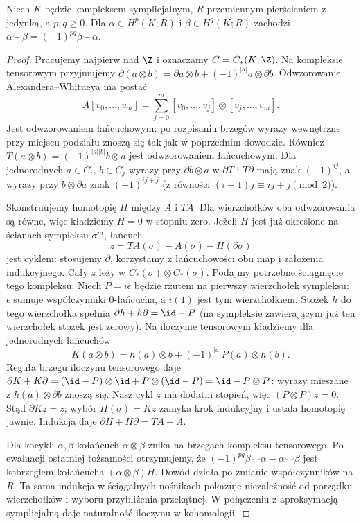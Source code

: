 \begin{stwierdzenie}
\label{prop:kubek-graded-16}
Niech $K$ będzie kompleksem symplicjalnym, $R$ przemiennym
pierścieniem z jedynką, a $p,q\geq0$. Dla
$\alpha\in H^p(K;R)$ i $\beta\in H^q(K;R)$
zachodzi
$\alpha\smile\beta=(-1)^{pq}\beta\smile\alpha$.
\end{stwierdzenie}
\begin{proof}
Pracujemy najpierw nad $\Z$ i oznaczamy $C=C_*(K;\Z)$.
Na kompleksie tensorowym przyjmujemy
$\partial(a\otimes b)=\partial a\otimes b+(-1)^{|a|}a\otimes\partial b$.
Odwzorowanie Alexandera--Whitneya ma postać
\[
 A[v_0,\ldots,v_m]
 =\sum_{j=0}^m[v_0,\ldots,v_j]\otimes[v_j,\ldots,v_m].
\]
Jest odwzorowaniem łańcuchowym: po rozpisaniu brzegów
wyrazy wewnętrzne przy miejscu podziału znoszą się
tak jak w poprzednim dowodzie. Również
$T(a\otimes b)=(-1)^{|a||b|}b\otimes a$
jest odwzorowaniem łańcuchowym. Dla jednorodnych
$a\in C_i$, $b\in C_j$ wyrazy przy
$\partial b\otimes a$ w $\partial T$ i $T\partial$
mają znak $(-1)^{ij}$, a wyrazy przy
$b\otimes\partial a$ znak $(-1)^{ij+j}$
(z równości $(i-1)j\equiv ij+j\pmod2$).

Skonstruujemy homotopię $H$ między $A$ i $TA$.
Dla wierzchołków oba odwzorowania są równe, więc
kładziemy $H=0$ w stopniu zero. Jeżeli $H$ jest
już określone na ścianach sympleksu $\sigma^m$,
łańcuch
\[
 z=TA(\sigma)-A(\sigma)-H(\partial\sigma)
\]
jest cyklem: stosujemy $\partial$, korzystamy
z łańcuchowości obu map i założenia indukcyjnego.
Cały $z$ leży w $C_*(\sigma)\otimes C_*(\sigma)$.
Podajmy potrzebne ściągnięcie tego kompleksu.
Niech $P=i\epsilon$ będzie rzutem na pierwszy wierzchołek
sympleksu: $\epsilon$ sumuje współczynniki $0$-łańcucha,
a $i(1)$ jest tym wierzchołkiem.
Stożek $h$ do tego wierzchołka spełnia
$\partial h+h\partial=\id-P$
(na sympleksie zawierającym już ten wierzchołek stożek
jest zerowy).
Na iloczynie tensorowym kładziemy dla jednorodnych łańcuchów
\[
 K(a\otimes b)=h(a)\otimes b+(-1)^{|a|}P(a)\otimes h(b).
\]
Reguła brzegu iloczynu tensorowego daje
$\partial K+K\partial
=(\id-P)\otimes\id+P\otimes(\id-P)=\id-P\otimes P$:
wyrazy mieszane z $h(a)\otimes\partial b$ znoszą się.
Nasz cykl $z$ ma dodatni stopień, więc $(P\otimes P)z=0$.
Stąd $\partial Kz=z$; wybór $H(\sigma)=Kz$
zamyka krok indukcyjny i ustala homotopię jawnie.
Indukcja daje $\partial H+H\partial=TA-A$.

Dla kocykli $\alpha,\beta$ kołańcuch
$\alpha\otimes\beta$ znika na brzegach kompleksu
tensorowego. Po ewaluacji ostatniej tożsamości
otrzymujemy, że
$(-1)^{pq}\beta\smile\alpha-\alpha\smile\beta$
jest kobrzegiem kołańcucha $(\alpha\otimes\beta)H$.
Dowód działa po zmianie współczynników na $R$.
Ta sama indukcja w ściągalnych nośnikach pokazuje
niezależność od porządku wierzchołków i wyboru
przybliżenia przekątnej. W połączeniu z aproksymacją
symplicjalną daje naturalność iloczynu w kohomologii.
\end{proof}

